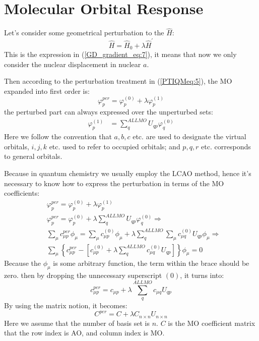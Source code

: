 \section{Molecular Orbital Response}\label{MO_response_gradient}
%
%
%
%
Let's consider some geometrical perturbation to the $\hat{H}$:
\begin{equation}
 \hat{H} = \hat{H}_{0} + \lambda\hat{H}^{'}
\end{equation}
This is the expression in (\ref{GD_gradient_eq:7}), it means that now we only
consider the nuclear displacement in nuclear $a$.

Then according to the perturbation treatment in (\ref{PTIQMeq:5}), the MO
expanded into first order is:
\begin{equation}
 \label{orbital_response_gradient_eq:1}
\varphi_{p}^{per} = \varphi_{p}^{(0)} + \lambda\varphi_{p}^{(1)}
\end{equation}
the perturbed part can always expressed over the unperturbed sets:
\begin{align}
 \label{orbital_response_gradient_eq:2}
\varphi_{p}^{(1)} &= \sum_{q}^{ALL MO}U_{qp}\varphi_{q}^{(0)}
\end{align}
Here we follow the convention that $a,b,c$ etc. are used to designate the
virtual orbitals, $i,j,k$ etc. used to refer to occupied orbitals; and $p,q,r$
etc. corresponds to general orbitals. 

Because in quantum chemistry we usually employ the LCAO method, hence it's
necessary to know how to express the perturbation in terms of the MO
coefficients:
\begin{align}
 \label{orbital_response_gradient_eq:3}
&\varphi_{p}^{per}  = \varphi_{p}^{(0)} + \lambda\varphi_{p}^{(1)} \nonumber \\
&\varphi_{p}^{per}  = \varphi_{p}^{(0)} + \lambda\sum_{q}^{ALL
MO}U_{qp}\varphi_{q}^{(0)} \Longrightarrow \nonumber \\
&\sum_{\mu}c^{per}_{\mu p}\phi_{\mu} = \sum_{\mu}c^{(0)}_{\mu p}\phi_{\mu} + 
\lambda\sum_{q}^{ALL
MO}\sum_{\mu}c^{(0)}_{\mu q}U_{qp}\phi_{\mu} \Longrightarrow \nonumber \\
&\sum_{\mu}\left\lbrace c^{per}_{\mu p} - [c^{(0)}_{\mu p} +
\lambda\sum_{q}^{ALL
MO}c^{(0)}_{\mu q}U_{qp}]\right\rbrace \phi_{\mu}  = 0
\end{align}
Because the $\phi_{\mu}$ is some arbitrary function, the term within the brace
should be zero. then by dropping the unnecessary superscript $(0)$, it turns
into:
\begin{equation}
 \label{orbital_response_gradient_eq:4}
c^{per}_{\mu p} = c_{\mu p} + \lambda\sum_{q}^{ALL
MO}c_{\mu q}U_{qp}
\end{equation}
By using the matrix notion, it becomes:
\begin{equation}
 \label{orbital_response_gradient_eq:5}
C^{per} = C + \lambda C_{n\times n}U_{n\times n}
\end{equation}
Here we assume that the number of basis set is $n$. $C$ is the MO coefficient
matrix that the row index is AO, and column index is MO.

